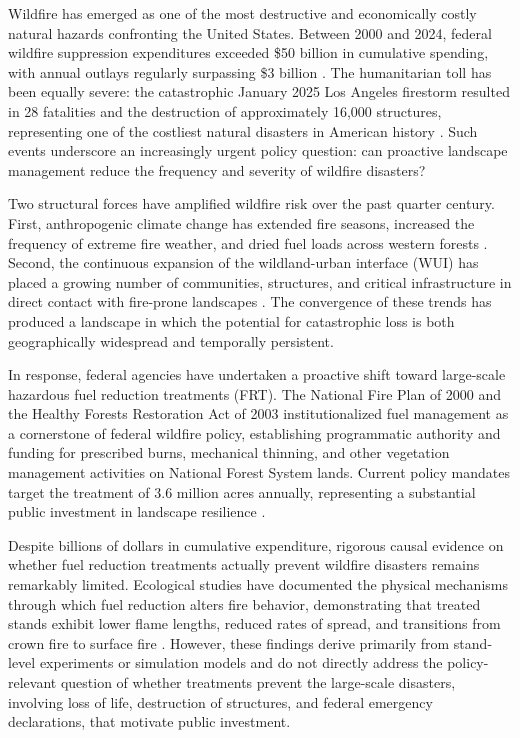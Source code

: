 \documentclass[12pt, letterpaper]{article}
\begin{document}
Wildfire has emerged as one of the most destructive and economically costly natural hazards confronting the United States. Between 2000 and 2024, federal wildfire suppression expenditures exceeded \$50 billion in cumulative spending, with annual outlays regularly surpassing \$3 billion \citep{calkin2005}. The humanitarian toll has been equally severe: the catastrophic January 2025 Los Angeles firestorm resulted in 28 fatalities and the destruction of approximately 16,000 structures, representing one of the costliest natural disasters in American history \citep{phillips2025}. Such events underscore an increasingly urgent policy question: can proactive landscape management reduce the frequency and severity of wildfire disasters?

Two structural forces have amplified wildfire risk over the past quarter century. First, anthropogenic climate change has extended fire seasons, increased the frequency of extreme fire weather, and dried fuel loads across western forests \citep{westerling2006, abatzoglou2016, brown2023}. Second, the continuous expansion of the wildland-urban interface (WUI) has placed a growing number of communities, structures, and critical infrastructure in direct contact with fire-prone landscapes \citep{radeloff2018, chen2024}. The convergence of these trends has produced a landscape in which the potential for catastrophic loss is both geographically widespread and temporally persistent.

In response, federal agencies have undertaken a proactive shift toward large-scale hazardous fuel reduction treatments (FRT). The National Fire Plan of 2000 and the Healthy Forests Restoration Act of 2003 institutionalized fuel management as a cornerstone of federal wildfire policy, establishing programmatic authority and funding for prescribed burns, mechanical thinning, and other vegetation management activities on National Forest System lands. Current policy mandates target the treatment of 3.6 million acres annually, representing a substantial public investment in landscape resilience \citep{usfs2022}.

Despite billions of dollars in cumulative expenditure, rigorous causal evidence on whether fuel reduction treatments actually prevent wildfire disasters remains remarkably limited. Ecological studies have documented the physical mechanisms through which fuel reduction alters fire behavior, demonstrating that treated stands exhibit lower flame lengths, reduced rates of spread, and transitions from crown fire to surface fire \citep{agee2005, finney2001, stephens2012}. However, these findings derive primarily from stand-level experiments or simulation models and do not directly address the policy-relevant question of whether treatments prevent the large-scale disasters, involving loss of life, destruction of structures, and federal emergency declarations, that motivate public investment.
\end{document}
